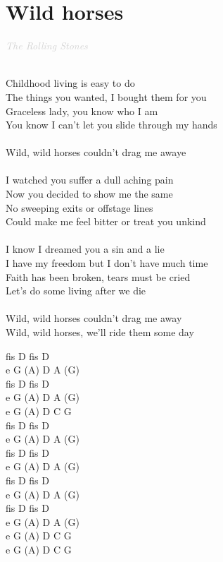 \documentclass[a5paper, 10pt]{book}
\begin{document}
\section{Wild horses}\textcolor{lightgray}{\textit{The Rolling Stones}}\\~\\
\begin{minipage}[t]{0.75\textwidth}
Childhood living is easy to do\\
The things you wanted, I bought them for you\\
Graceless lady, you know who I am\\
You know I can't let you slide through my hands\\
\\
\hspace*{5mm}Wild, wild horses couldn't drag me awaye\\
\\
I watched you suffer a dull aching pain\\
Now you decided to show me the same\\
No sweeping exits or offstage lines\\
Could make me feel bitter or treat you unkind\\
\\
I know I dreamed you a sin and a lie\\
I have my freedom but I don't have much time\\
Faith has been broken, tears must be cried\\
Let's do some living after we die\\
\\
\hspace*{5mm}Wild, wild horses couldn't drag me away\\
\hspace*{5mm}Wild, wild horses, we'll ride them some day\\
\end{minipage}
\begin{minipage}[t]{0.25\textwidth}
fis D fis D\\
e G (A) D A (G)\\
fis D fis D\\
e G (A) D A (G)\\

e G (A) D C G \\

fis D fis D\\
e G (A) D A (G)\\
fis D fis D\\
e G (A) D A (G)\\

fis D fis D\\
e G (A) D A (G)\\
fis D fis D\\
e G (A) D A (G)\\

e G (A) D C G \\
e G (A) D C G \\

\end{minipage}
\end{document}
